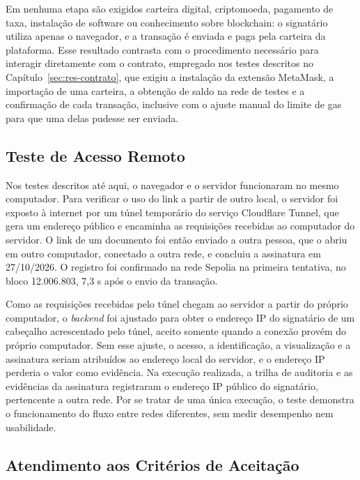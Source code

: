 \documentclass[
    12pt,
    a4paper,
    oneside,
    chapter=TITLE,
    section=TITLE,
    subsection=TITLE,
    subsubsection=TITLE,
    sumario=tradicional,
    english,
    brazil
]{abntex2}
\begin{document}
Em nenhuma etapa são exigidos carteira digital, criptomoeda, pagamento de taxa, instalação de software ou conhecimento sobre blockchain: o signatário utiliza apenas o navegador, e a transação é enviada e paga pela carteira da plataforma. Esse resultado contrasta com o procedimento necessário para interagir diretamente com o contrato, empregado nos testes descritos no Capítulo~\ref{sec:res-contrato}, que exigiu a instalação da extensão MetaMask, a importação de uma carteira, a obtenção de saldo na rede de testes e a confirmação de cada transação, inclusive com o ajuste manual do limite de gas para que uma delas pudesse ser enviada.

\subsection{Teste de Acesso Remoto}
\label{sec:res-remoto}

Nos testes descritos até aqui, o navegador e o servidor funcionaram no mesmo computador. Para verificar o uso do link a partir de outro local, o servidor foi exposto à internet por um túnel temporário do serviço Cloudflare Tunnel, que gera um endereço público e encaminha as requisições recebidas ao computador do servidor. O link de um documento foi então enviado a outra pessoa, que o abriu em outro computador, conectado a outra rede, e concluiu a assinatura em 27/10/2026. O registro foi confirmado na rede Sepolia na primeira tentativa, no bloco 12.006.803, 7,3 s após o envio da transação.

Como as requisições recebidas pelo túnel chegam ao servidor a partir do próprio computador, o \emph{backend} foi ajustado para obter o endereço IP do signatário de um cabeçalho acrescentado pelo túnel, aceito somente quando a conexão provém do próprio computador. Sem esse ajuste, o acesso, a identificação, a visualização e a assinatura seriam atribuídos ao endereço local do servidor, e o endereço IP perderia o valor como evidência. Na execução realizada, a trilha de auditoria e as evidências da assinatura registraram o endereço IP público do signatário, pertencente a outra rede. Por se tratar de uma única execução, o teste demonstra o funcionamento do fluxo entre redes diferentes, sem medir desempenho nem usabilidade.

\subsection{Atendimento aos Critérios de Aceitação}
\end{document}
